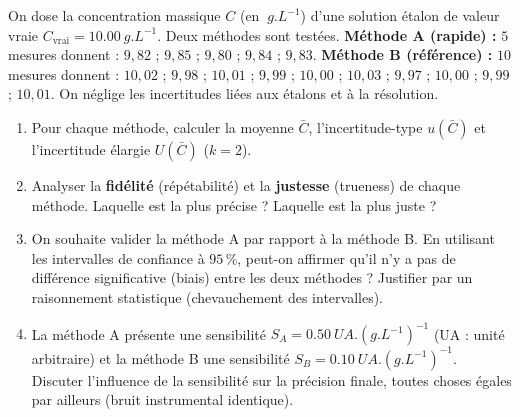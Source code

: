 \documentclass[11pt]{article}
\begin{document}
\begin{exercice}
On dose la concentration massique $C$ (en $\SI{}{g.L^{-1}}$) d'une solution étalon de valeur vraie $C_{\text{vrai}} = \SI{10,00}{g.L^{-1}}$. Deux méthodes sont testées.
\textbf{Méthode A (rapide) :} $5$ mesures donnent : $9,82$ ; $9,85$ ; $9,80$ ; $9,84$ ; $9,83$.
\textbf{Méthode B (référence) :} $10$ mesures donnent : $10,02$ ; $9,98$ ; $10,01$ ; $9,99$ ; $10,00$ ; $10,03$ ; $9,97$ ; $10,00$ ; $9,99$ ; $10,01$.
On néglige les incertitudes liées aux étalons et à la résolution.
\begin{enumerate}
    \item Pour chaque méthode, calculer la moyenne $\bar{C}$, l'incertitude-type $u(\bar{C})$ et l'incertitude élargie $U(\bar{C})$ ($k=2$).
    \item Analyser la \textbf{fidélité} (répétabilité) et la \textbf{justesse} (trueness) de chaque méthode. Laquelle est la plus précise ? Laquelle est la plus juste ?
    \item On souhaite valider la méthode A par rapport à la méthode B. En utilisant les intervalles de confiance à $95\,\%$, peut-on affirmer qu'il n'y a pas de différence significative (biais) entre les deux méthodes ? Justifier par un raisonnement statistique (chevauchement des intervalles).
    \item La méthode A présente une sensibilité $S_A = \SI{0,50}{UA.(g.L^{-1})^{-1}}$ (UA : unité arbitraire) et la méthode B une sensibilité $S_B = \SI{0,10}{UA.(g.L^{-1})^{-1}}$. Discuter l'influence de la sensibilité sur la précision finale, toutes choses égales par ailleurs (bruit instrumental identique).
\end{enumerate}
\end{exercice}
\end{document}
